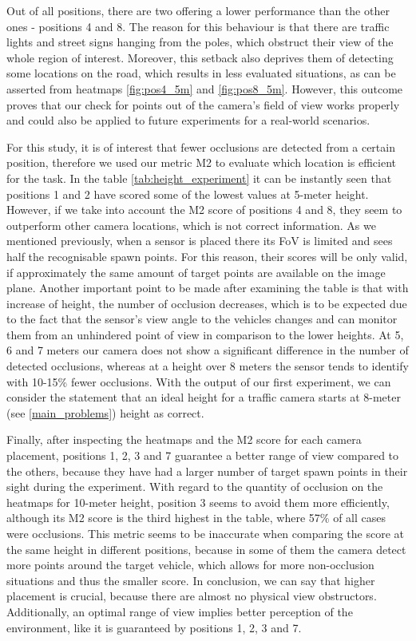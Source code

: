 Out of all positions, there are two offering a lower performance than the other ones - positions 4 and 8. The reason for this behaviour is that there are traffic lights and street signs hanging from the poles, which obstruct their view of the whole region of interest. Moreover, this setback also deprives them of detecting some locations on the road, which results in less evaluated situations, as can be asserted from heatmaps \ref{fig:pos4_5m} and \ref{fig:pos8_5m}. However, this outcome proves that our check for points out of the camera's field of view works properly and could also be applied to future experiments for a real-world scenarios.

For this study, it is of interest that fewer occlusions are detected from a certain position, therefore we used our metric M2 to evaluate which location is efficient for the task. In the table \ref{tab:height_experiment} it can be instantly seen that positions 1 and 2 have scored some of the lowest values at 5-meter height. However, if we take into account the M2 score of positions 4 and 8, they seem to outperform other camera locations, which is not correct information. As we mentioned previously, when a sensor is placed there its FoV is limited and sees half the recognisable spawn points. For this reason, their scores will be only valid, if approximately the same amount of target points are available on the image plane. Another important point to be made after examining the table is that with increase of height, the number of occlusion decreases, which is to be expected due to the fact that the sensor's view angle to the vehicles changes and can monitor them from an unhindered point of view in comparison to the lower heights. At 5, 6 and 7 meters our camera does not show a significant difference in the number of detected occlusions, whereas at a height over 8 meters the sensor tends to identify with 10-15\% fewer occlusions. With the output of our first experiment, we can consider the statement that an ideal height for a traffic camera starts at 8-meter (see \ref{main_problems}) height as correct.

Finally, after inspecting the heatmaps and the M2 score for each camera placement, positions 1, 2, 3 and 7 guarantee a better range of view compared to the others, because they have had a larger number of target spawn points in their sight during the experiment. With regard to the quantity of occlusion on the heatmaps for 10-meter height, position 3 seems to avoid them more efficiently, although its M2 score is the third highest in the table, where 57\% of all cases were occlusions. This metric seems to be inaccurate when comparing the score at the same height in different positions, because in some of them the camera detect more points around the target vehicle, which allows for more non-occlusion situations and thus the smaller score. In conclusion, we can say that higher placement is crucial, because there are almost no physical view obstructors. Additionally, an optimal range of view implies better perception of the environment, like it is guaranteed by positions 1, 2, 3 and 7.


